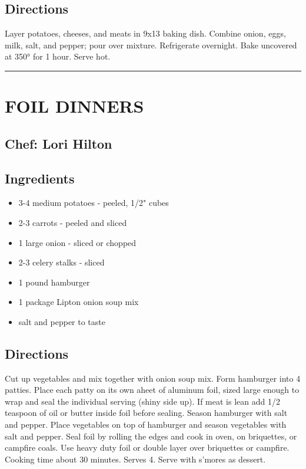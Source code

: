\documentclass[
]{book}
\providecommand{\tightlist}{%
  \setlength{\itemsep}{0pt}\setlength{\parskip}{0pt}}
\begin{document}
\hypertarget{directions-55}{%
\subsection*{Directions}\label{directions-55}}


Layer potatoes, cheeses, and meats in 9x13 baking dish. Combine onion, eggs, milk, salt, and pepper; pour over mixture. Refrigerate overnight. Bake uncovered at 350° for 1 hour. Serve hot.

\begin{center}\rule{0.5\linewidth}{0.5pt}\end{center}

\hypertarget{foil-dinners}{%
\section*{FOIL DINNERS}\label{foil-dinners}}


\hypertarget{chef-lori-hilton-4}{%
\subsection*{Chef: Lori Hilton}\label{chef-lori-hilton-4}}


\hypertarget{ingredients-56}{%
\subsection*{Ingredients}\label{ingredients-56}}


\begin{itemize}
\tightlist
\item
  3-4 medium potatoes - peeled, 1/2" cubes
\item
  2-3 carrots - peeled and sliced
\item
  1 large onion - sliced or chopped
\item
  2-3 celery stalks - sliced
\item
  1 pound hamburger
\item
  1 package Lipton onion soup mix
\item
  salt and pepper to taste
\end{itemize}

\hypertarget{directions-56}{%
\subsection*{Directions}\label{directions-56}}


Cut up vegetables and mix together with onion soup mix. Form hamburger into 4 patties. Place each patty on its own aheet of aluminum foil, sized large enough to wrap and seal the individual serving (shiny side up). If meat is lean add 1/2 teaspoon of oil or butter inside foil before sealing. Season hamburger with salt and pepper. Place vegetables on top of hamburger and season vegetables with salt and pepper. Seal foil by rolling the edges and cook in oven, on briquettes, or campfire coals. Use heavy duty foil or double layer over briquettes or campfire. Cooking time about 30 minutes. Serves 4. Serve with s'mores as dessert.
\end{document}
